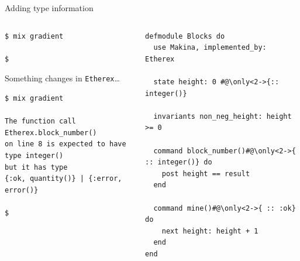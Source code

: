 \documentclass[aspectratio=169, 10pt, handout]{beamer}
\begin{document}
\begin{frame}[label={sec:orgff89665},fragile]{Adding type information}
 \begin{columns}
\begin{column}{0.48\columnwidth}
\lstset{language=bash,label= ,caption= ,captionpos=b,numbers=none,style=shell}
\begin{lstlisting}
$ mix gradient

$
\end{lstlisting}

\vspace{10pt}
Something changes in \texttt{Etherex}\ldots{}

\vspace{10pt}

\lstset{language=bash,label= ,caption= ,captionpos=b,numbers=none,style=shell}
\begin{lstlisting}
$ mix gradient

The function call Etherex.block_number()
on line 8 is expected to have type integer()
but it has type
{:ok, quantity()} | {:error, error()}

$
\end{lstlisting}
\end{column}

\begin{column}{0.48\columnwidth}
\lstset{language=elixir,label= ,caption= ,captionpos=b,numbers=none,style=display, numbers=left}
\begin{lstlisting}
defmodule Blocks do
  use Makina, implemented_by: Etherex

  state height: 0 #@\only<2->{:: integer()}

  invariants non_neg_height: height >= 0

  command block_number()#@\only<2->{ :: integer()} do
    post height == result
  end

  command mine()#@\only<2->{ :: :ok} do
    next height: height + 1
  end
end
\end{lstlisting}
\end{column}
\end{columns}
\end{frame}
\end{document}
